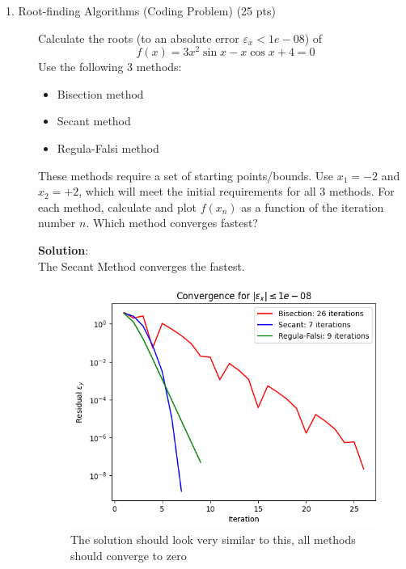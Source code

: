 \documentclass[12pt]{article}
\begin{document}
\begin{description}
\item[1. Root-finding Algorithms \color{red} (Coding Problem) \color{black} (25 pts)]
Calculate the roots (to an absolute error $\varepsilon_x < 1e-08$) of
    \begin{equation*}
        f (x) = 3x^{2}\sin{x} - x\cos{x} + 4 = 0
    \end{equation*}
Use the following 3 methods:
    \begin{itemize}
   	\item Bisection method
   	\item Secant method
   	\item Regula-Falsi method
    \end{itemize}

    These methods require a set of starting points/bounds. Use $x_1 = -2$ and $x_2 = +2$, which will meet the initial requirements for all 3 methods. For each method, calculate and plot $f(x_{n})$ as a function of the iteration number $n$. Which method converges fastest?
    
    \color{red}
    \ifsolution
    {\bf Solution}:\\ The Secant Method converges the fastest.
    
    \begin{figure}[h!]
    	\centering\includegraphics[width=4.5in]{HW1Fig1.png}
    	\caption{The solution should look very similar to this, all methods should converge to zero}
    	\label{fig:RootFindingAlgorithms}
    \end{figure}
    \fi
    \color{black}


\end{description}
\end{document}
